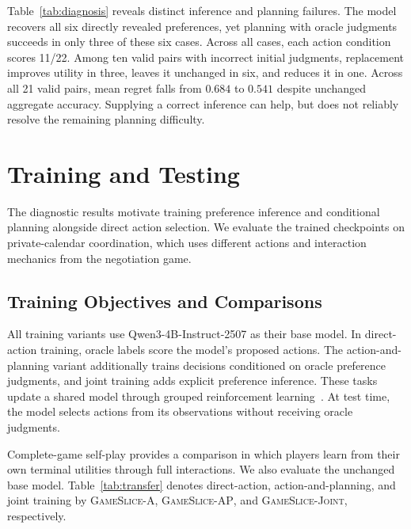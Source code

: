 \documentclass[11pt,a4paper]{article}
\begin{document}
Table~\ref{tab:diagnosis} reveals distinct inference and planning failures.
The model recovers all six directly revealed preferences, yet planning
with oracle judgments succeeds in only three of these six cases. Across
all cases, each action condition scores 11/22. Among ten valid pairs with
incorrect initial judgments, replacement improves utility in three,
leaves it unchanged in six, and reduces it in one. Across all 21 valid
pairs, mean regret falls from $0.684$ to $0.541$ despite unchanged aggregate
accuracy. Supplying a correct inference can help, but does not reliably
resolve the remaining planning difficulty.

\section{Training and Testing}
\label{sec:training-testing}
The diagnostic results motivate training preference inference and
conditional planning alongside direct action selection. We evaluate the
trained checkpoints on
private-calendar coordination, which uses different actions and interaction
mechanics from the negotiation game.

\subsection{Training Objectives and Comparisons}
All training variants use Qwen3-4B-Instruct-2507 as their base model.
In direct-action training, oracle labels score the model's proposed actions. The
action-and-planning variant additionally trains decisions conditioned on
oracle preference judgments, and joint training adds explicit preference
inference. These tasks update a shared model through grouped reinforcement
learning~\cite{shao2024deepseekmath}. At test time, the model selects actions
from its observations without receiving oracle judgments.

Complete-game self-play provides a comparison in which players learn from
their own terminal utilities through full interactions. We also evaluate
the unchanged base model. Table~\ref{tab:transfer} denotes direct-action,
action-and-planning, and joint training by \textsc{GameSlice-A},
\textsc{GameSlice-AP}, and \textsc{GameSlice-Joint}, respectively.
\end{document}
